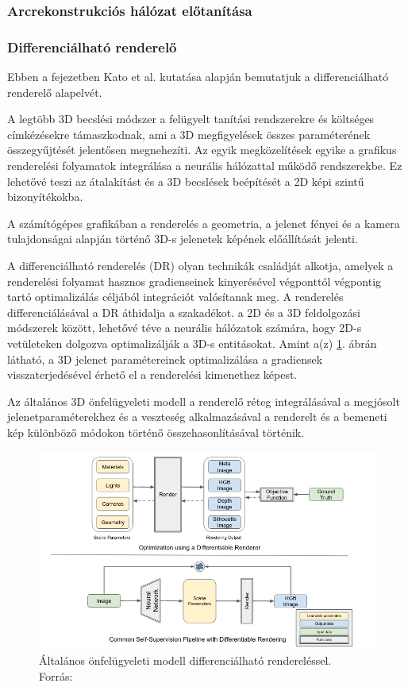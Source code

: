 \documentclass[12pt,a4]{article}
\begin{document}
    \subsubsection{Arcrekonstrukciós hálózat előtanítása}
    
    \subsubsection{Differenciálható renderelő}

    Ebben a fejezetben Kato et al. \cite{diffrenderer} kutatása alapján bemutatjuk a differenciálható renderelő alapelvét.

    A legtöbb 3D becslési módszer a
felügyelt tanítási rendszerekre és költséges címkézésekre támaszkodnak, ami
a 3D megfigyelések összes paraméterének összegyűjtését jelentősen megnehezíti.
Az egyik
megközelítések egyike a grafikus renderelési folyamatok integrálása
a neurális hálózattal működő rendszerekbe. Ez lehetővé teszi az átalakítást és
a 3D becslések beépítését a 2D képi szintű bizonyítékokba.

A számítógépes grafikában a renderelés a geometria, a jelenet fényei és a kamera tulajdonságai alapján történő 3D-s jelenetek képének előállítását jelenti.

A differenciálható renderelés (DR) olyan technikák családját alkotja, amelyek a renderelési folyamat hasznos gradienseinek kinyerésével végponttól végpontig tartó optimalizálás céljából integrációt valósítanak meg. A renderelés differenciálásával a DR áthidalja a szakadékot.
a 2D és a 3D feldolgozási módszerek között, lehetővé téve a neurális hálózatok számára, hogy 2D-s vetületeken dolgozva optimalizálják a 3D-s entitásokat. Amint a(z) \ref{fig:diffrenderer}. ábrán látható, a 3D jelenet paramétereinek optimalizálása a gradiensek visszaterjedésével érhető el a renderelési kimenethez képest. 

Az általános 3D önfelügyeleti modell a renderelő réteg integrálásával a megjósolt jelenetparaméterekhez és a veszteség alkalmazásával a renderelt és a bemeneti kép különböző módokon történő összehasonlításával történik.

    \begin{figure}[h]	
		\centering
		\includegraphics[width=1\linewidth]{diffrenderer}
		\caption{Általános önfelügyeleti modell differenciálható rendereléssel.\\
                Forrás: \cite{diffrenderer}}
        \label{fig:diffrenderer}
	\end{figure}
 \newpage
\end{document}
